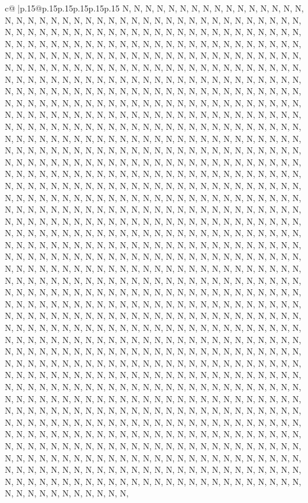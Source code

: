 \documentclass{article}
\begin{document}
{\begin{supertabular}{c@{$\;$}|p{.15\linewidth}@{}p{.15\linewidth}p{.15\linewidth}p{.15\linewidth}p{.15\linewidth}p{.15\linewidth}}
{{{N, N, N, N, N, N, N, N, N, N, N, N, N, N, N, N, N, N, N, N, N, N, N, N, N, N, N, N, N, N, N, N, N, N, N, N, N, N, N, N, N, N, N, N, N, N, N, N, N, N, N, N, N, N, N, N, N, N, N, N, N, N, N, N, N, N, N, N, N, N, N, N, N, N, N, N, N, N, N, N, N, N, N, N, N, N, N, N, N, N, N, N, N, N, N, N, N, N, N, N, N, N, N, N, N, N, N, N, N, N, N, N, N, N, N, N, N, N, N, N, N, N, N, N, N, N, N, N, N, N, N, N, N, N, N, N, N, N, N, N, N, N, N, N, N, N, N, N, N, N, N, N, N, N, N, N, N, N, N, N, N, N, N, N, N, N, N, N, N, N, N, N, N, N, N, N, N, N, N, N, N, N, N, N, N, N, N, N, N, N, N, N, N, N, N, N, N, N, N, N, N, N, N, N, N, N, N, N, N, N, N, N, N, N, N, N, N, N, N, N, N, N, N, N, N, N, N, N, N, N, N, N, N, N, N, N, N, N, N, N, N, N, N, N, N, N, N, N, N, N, N, N, N, N, N, N, N, N, N, N, N, N, N, N, N, N, N, N, N, N, N, N, N, N, N, N, N, N, N, N, N, N, N, N, N, N, N, N, N, N, N, N, N, N, N, N, N, N, N, N, N, N, N, N, N, N, N, N, N, N, N, N, N, N, N, N, N, N, N, N, N, N, N, N, N, N, N, N, N, N, N, N, N, N, N, N, N, N, N, N, N, N, N, N, N, N, N, N, N, N, N, N, N, N, N, N, N, N, N, N, N, N, N, N, N, N, N, N, N, N, N, N, N, N, N, N, N, N, N, N, N, N, N, N, N, N, N, N, N, N, N, N, N, N, N, N, N, N, N, N, N, N, N, N, N, N, N, N, N, N, N, N, N, N, N, N, N, N, N, N, N, N, N, N, N, N, N, N, N, N, N, N, N, N, N, N, N, N, N, N, N, N, N, N, N, N, N, N, N, N, N, N, N, N, N, N, N, N, N, N, N, N, N, N, N, N, N, N, N, N, N, N, N, N, N, N, N, N, N, N, N, N, N, N, N, N, N, N, N, N, N, N, N, N, N, N, N, N, N, N, N, N, N, N, N, N, N, N, N, N, N, N, N, N, N, N, N, N, N, N, N, N, N, N, N, N, N, N, N, N, N, N, N, N, N, N, N, N, N, N, N, N, N, N, N, N, N, N, N, N, N, N, N, N, N, N, N, N, N, N, N, N, N, N, N, N, N, N, N, N, N, N, N, N, N, N, N, N, N, N, N, N, N, N, N, N, N, N, N, N, N, N, N, N, N, N, N, N, N, N, N, N, N, N, N, N, N, N, N, N, N, N, N, N, N, N, N, N, N, N, N, N, N, N, N, N, N, N, N, N, N, N, N, N, N, N, N, N, N, N, N, N, N, N, N, N, N, N, N, N, N, N, N, N, N, N, N, N, N, N, N, N, N, N, N, N, N, N, N, N, N, N, N, N, N, N, N, N, N, N, N, N, N, N, N, N, N, N, N, N, N, N, N, N, N, N, N, N, N, N, N, N, N, N, N, N, N, N, N, N, N, N, N, N, N, N, N, N, N, N, N, N, N, N, N, N, N, N, N, N, N, N, N, N, N, N, N, N, N, N, N, N, N, N, N, N, N, N, N, N, N, N, N, N, N, N, N, N, N, N, N, N, N, N, N, N, N, N, N, N, N, N, N, N, N, N, N, N, N, N, N, N, N, N, N, N, N, N, N, N, N, N, N, N, N, N, N, N, N, N, N, N, N, N, N, N, N, N, N, N, N, N, N, N, N, N, N, N, N, N, N, N, N, N, N, N, N, N, N, N, N, N, N, N, N, N, N, N, N, N, N, N, N, N, N, N, N, N, N, N, N, N, N, N, N, N, N, N, N, N, N, N, N, N, N, N, N, N, N, N, N, N, N, N, N, N, N, N, N, N, N, N, N, N, N, N, N, N, N, N, N, N, N, N, N, N, N, N, N, N, N, N, N, N, N, N, N, N, N, N, N, N, N, N, N, N, N, N, N, N, N, N, N, N, N, N, N, N, N, N, N, N, N, N, N, N, N, N, N, N, N, N, N, N, N, N, N, N, N, N, N, N, N, N, N, N, N, N, N, N, N, N, N, N, N, N, N, N, N, N, N, N, N, N, N, N, N, N, N, N, N, N, N, N, N, N, N, N, N, N, N, N, N, N, N, N, N, N, N, N, N, N, N, N, N, N, N, N, N, N, N, N, N, N, N, N, N, N, N, N, N, N, N, N, N, N, N, N, N, N, N, N, N, N, N, N, N, N, N, N, N, N, N, N, N, N, N, N, N, N, N, N, N, N, N, N, N, N, N, N, N, N, N, N, N, N, N, }}}
\end{supertabular}}
\end{document}
